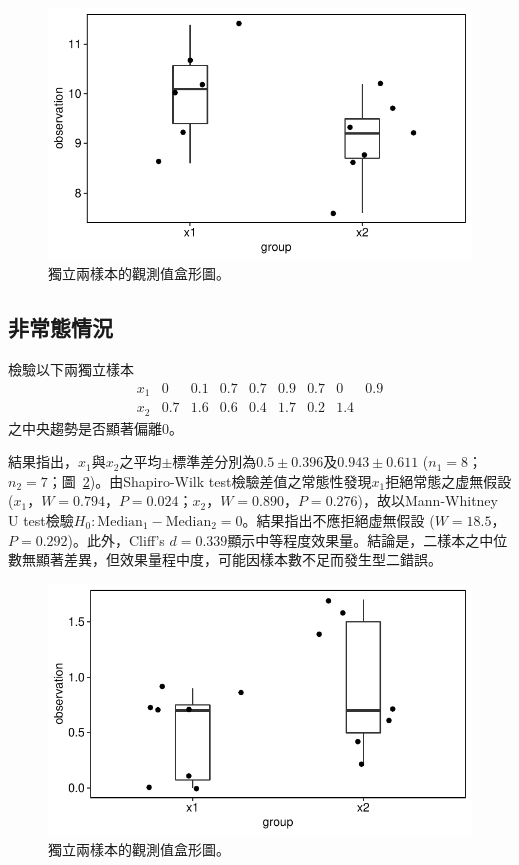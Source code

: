 \documentclass[12pt]{article}
\renewcommand{\figurename}{圖}
\newcommand*{\figref}[1]{\figurename~\ref{#1}}
\begin{document}
\begin{figure}[htbp]
	\centering
	\includegraphics[]{normal_independent_test.pdf}
	\caption{獨立兩樣本的觀測值盒形圖。}
	\label{fig:normal_independent_test}
\end{figure}

\subsection{非常態情況}
檢驗以下兩獨立樣本
\[
\begin{matrix}
x_1 & 0 & 0.1 & 0.7 & 0.7 & 0.9 & 0.7 & 0 & 0.9 \\
x_2 & 0.7 & 1.6 & 0.6 & 0.4 & 1.7 & 0.2 & 1.4 & 
\end{matrix}
\]
之中央趨勢是否顯著偏離0。

結果指出，$x_1$與$x_2$之平均$\pm$標準差分別為$0.5 \pm 0.396$及$0.943 \pm 0.611$ ($n_1 = 8$；$n_2=7$；\figref{fig:non-normal_independent_test})。由Shapiro-Wilk test檢驗差值之常態性發現$x_1$拒絕常態之虚無假設 ($x_1$，$W = 0.794$，$P = 0.024$；$x_2$，$W = 0.890$，$P = 0.276$)，故以Mann-Whitney U test檢驗$H_0: \text{Median}_1 - \text{Median}_2 = 0$。結果指出不應拒絕虚無假設 ($W = 18.5$，$P = 0.292$)。此外，Cliff's $d=0.339$顯示中等程度效果量。結論是，二樣本之中位數無顯著差異，但效果量程中度，可能因樣本數不足而發生型二錯誤。
\begin{figure}[htbp]
	\centering
	\includegraphics[]{non-normal_independent_test.pdf}
	\caption{獨立兩樣本的觀測值盒形圖。}
	\label{fig:non-normal_independent_test}
\end{figure}
\end{document}
